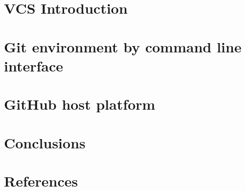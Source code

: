\documentclass{beamer}
\begin{document}
\section{VCS Introduction}


\section{Git environment by command line interface}


\section{GitHub host platform}


%

\section{Conclusions}
%

\section{References}

\end{document}
